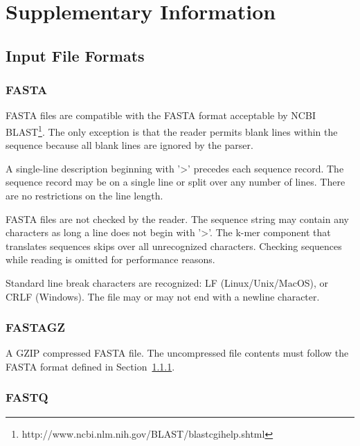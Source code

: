 
\section{Supplementary Information}
\label{sec.suppl}


\subsection{Input File Formats}
\label{sec.suppl.fileformats}

\subsubsection{FASTA}
\label{sec.suppl.fileformats.fasta}

FASTA files are compatible with the FASTA format acceptable by NCBI BLAST\footnote{http://www.ncbi.nlm.nih.gov/BLAST/blastcgihelp.shtml}. The only exception is that the reader permits blank lines within the sequence because all blank lines are ignored by the parser.

A single-line description beginning with '>' precedes each sequence record. The sequence record may be on a single line or split over any number of lines. There are no restrictions on the line length.

FASTA files are not checked by the reader. The sequence string may contain any characters as long a line does not begin with '>'. The k-mer component that translates sequences skips over all unrecognized characters. Checking sequences while reading is omitted for performance reasons.

Standard line break characters are recognized: LF (Linux/Unix/MacOS), or CRLF (Windows). The file may or may not end with a newline character.

\subsubsection{FASTAGZ}
\label{sec.supl.fileformats.fastagz}

A GZIP compressed FASTA file. The uncompressed file contents must follow the FASTA format defined in Section~\ref{sec.suppl.fileformats.fasta}.

\subsubsection{FASTQ}
\label{sec.suppl.fileformats.fastq}

